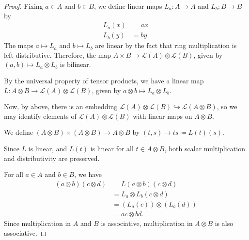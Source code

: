 \begin{proof}
  Fixing $a\in A$ and $b\in B$, we define linear maps $L_a\colon A\rightarrow A$ and $L_b\colon B\rightarrow B$  by
  \begin{align*}
    L_a\left( x \right) &= ax\\
    L_b\left( y \right) &= by.
  \end{align*}
  The maps $a\mapsto L_a$ and $b\mapsto L_b$ are linear by the fact that ring multiplication is left-distributive. Therefore, the map $A\times B \rightarrow \mathcal{L}\left( A \right)\otimes \mathcal{L}\left( B \right)$, given by $\left( a,b \right)\mapsto L_a\otimes L_b$ is bilinear.\newline

  By the universal property of tensor products, we have a linear map $L\colon A\otimes B \rightarrow \mathcal{L}\left( A \right)\otimes \mathcal{L}\left( B \right)$, given by $a\otimes b \mapsto L_a\otimes L_b$.\newline

  Now, by above, there is an embedding $\mathcal{L}\left( A \right)\otimes \mathcal{L}\left( B \right) \hookrightarrow \mathcal{L}\left( A\otimes B \right)$, so we may identify elements of $\mathcal{L}\left( A \right)\otimes \mathcal{L}\left( B \right)$ with linear maps on $A\otimes B$.\newline

  We define $\left( A\otimes B \right)\times \left( A\otimes B \right)\rightarrow A\otimes B$ by $\left( t,s \right)\mapsto ts \coloneq L(t)(s)$.\newline

  Since $L$ is linear, and $L(t)$ is linear for all $t\in A\otimes B$, both scalar multiplication and distributivity are preserved.\newline

  For all $a\in A$ and $b\in B$, we have
  \begin{align*}
    \left( a\otimes b \right)\left( c\otimes d \right) &= L\left( a\otimes b \right)\left( c\otimes d \right)\\
                                                       &= L_a\otimes L_b\left( c\otimes d \right)\\
                                                       &= \left( L_a\left( c \right) \right)\otimes \left( L_b\left( d \right) \right)\\
                                                       &= ac\otimes bd.
  \end{align*}
  Since multiplication in $A$ and $B$ is associative, multiplication in $A\otimes B$ is also associative.\newline


\end{proof}
